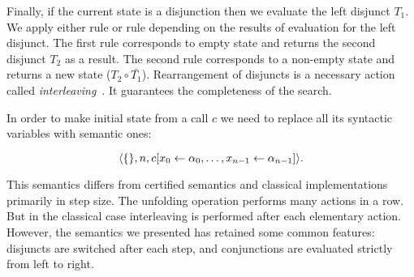 Finally, if the current state is a disjunction then we evaluate the left disjunct $T_1$. We apply either rule  or rule  depending
on the results of evaluation for the left disjunct. The first rule corresponds to empty state and returns the second disjunct $T_2$ as a result. The second rule corresponds
to a non-empty state and returns a new state ($T_2 \circ \bar{T_1}$). Rearrangement of disjuncts is a necessary action called \emph{interleaving}~\cite{fair:interleaving}.
It guarantees the completeness of the search.

In order to make initial state from a call $c$ we need to replace all its syntactic variables with semantic ones:

\[
\langle \{\}, n, c[x_0 \leftarrow \alpha_0, \ldots, x_{n-1} \leftarrow \alpha_{n-1}] \rangle.
\]

This semantics differs from certified semantics and classical implementations primarily in step size. The unfolding operation performs many actions in a row.
But in the classical case interleaving is performed after each elementary action. However, the semantics we presented has retained some common features: disjuncts are switched 
after each step, and conjunctions are evaluated strictly from left to right. 


